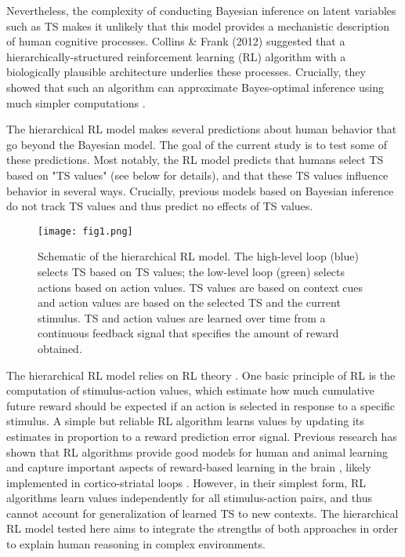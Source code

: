 \documentclass[10pt, letterpaper]{article}
\begin{document}
Nevertheless, the complexity of conducting Bayesian inference on latent variables such as TS makes it unlikely that this model provides a mechanistic description of human cognitive processes. Collins \& Frank (2012) suggested that a hierarchically-structured reinforcement learning (RL) algorithm with a biologically plausible architecture underlies these processes. Crucially, they showed that such an algorithm can approximate Bayes-optimal inference using much simpler computations \cite{collins_cognitive_2013}.

The hierarchical RL model makes several predictions about human behavior that go beyond the Bayesian model. The goal of the current study is to test some of these predictions. Most notably, the RL model predicts that humans select TS based on "TS values" (see below for details), and that these TS values influence behavior in several ways. Crucially, previous models based on Bayesian inference do not track TS values and thus predict no effects of TS values. 

\begin{figure}[ht]
    \begin{center}
	\texttt{[image: fig1.png]}
    \end{center}
    \caption{Schematic of the hierarchical RL model. The high-level loop (blue) selects TS based on TS values; the low-level loop (green) selects actions based on action values. TS values are based on context cues and action values are based on the selected TS and the current stimulus. TS and action values are learned over time from a continuous feedback signal that specifies the amount of reward obtained.} 
    \label{figure:2loops}
\end{figure}

The hierarchical RL model relies on RL theory \cite{sutton_reinforcement_2017}. One basic principle of RL is the computation of stimulus-action values, which estimate how much cumulative future reward should be expected if an action is selected in response to a specific stimulus. A simple but reliable RL algorithm learns values by updating its estimates in proportion to a reward prediction error signal. Previous research has shown that RL algorithms provide good models for human and animal learning \cite{daw_model-based_2011} and capture important aspects of reward-based learning in the brain \cite{schultz_neural_1997}, likely implemented in cortico-striatal loops \cite{alexander_parallel_1986}. However, in their simplest form, RL algorithms learn values independently for all stimulus-action pairs, and thus cannot account for generalization of learned TS to new contexts. The hierarchical RL model tested here aims to integrate the strengths of both approaches in order to explain human reasoning in complex environments.
\end{document}
